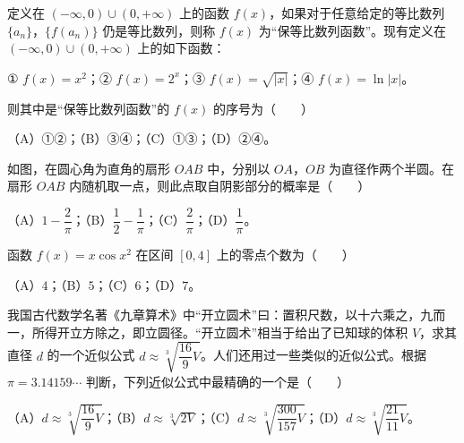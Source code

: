 \begin{question}
定义在 $(-\infty,0)\cup(0,+\infty)$ 上的函数 $f(x)$，如果对于任意给定的等比数列 $\{a_n\}$，$\{f(a_n)\}$ 仍是等比数列，则称 $f(x)$ 为“保等比数列函数”。现有定义在 $(-\infty,0)\cup(0,+\infty)$ 上的如下函数：

① $f(x)=x^2$；② $f(x)=2^x$；③ $f(x)=\sqrt{|x|}$；④ $f(x)=\ln|x|$。

则其中是“保等比数列函数”的 $f(x)$ 的序号为\mbox{（　　）}

（A）①②；（B）③④；（C）①③；（D）②④。

\Needspace{0.4\textheight}
\end{question}
\begin{question}
如图，在圆心角为直角的扇形 $OAB$ 中，分别以 $OA$，$OB$ 为直径作两个半圆。在扇形 $OAB$ 内随机取一点，则此点取自阴影部分的概率是\mbox{（　　）}
\nopagebreak[4]
\begin{center}\end{center}
\nopagebreak[4]
（A）$1-\dfrac{2}{\pi}$；（B）$\dfrac12-\dfrac{1}{\pi}$；（C）$\dfrac{2}{\pi}$；（D）$\dfrac{1}{\pi}$。

\end{question}
\begin{question}
函数 $f(x)=x\cos x^2$ 在区间 $[0,4]$ 上的零点个数为\mbox{（　　）}

（A）$4$；（B）$5$；（C）$6$；（D）$7$。

\end{question}
\begin{question}
我国古代数学名著《九章算术》中“开立圆术”曰：置积尺数，以十六乘之，九而一，所得开立方除之，即立圆径。“开立圆术”相当于给出了已知球的体积 $V$，求其直径 $d$ 的一个近似公式 $d\approx\sqrt[3]{\dfrac{16}{9}V}$。人们还用过一些类似的近似公式。根据 $\pi=3.14159\cdots$ 判断，下列近似公式中最精确的一个是\mbox{（　　）}

（A）$d\approx\sqrt[3]{\dfrac{16}{9}V}$；（B）$d\approx\sqrt[3]{2V}$；（C）$d\approx\sqrt[3]{\dfrac{300}{157}V}$；（D）$d\approx\sqrt[3]{\dfrac{21}{11}V}$。

\end{question}

